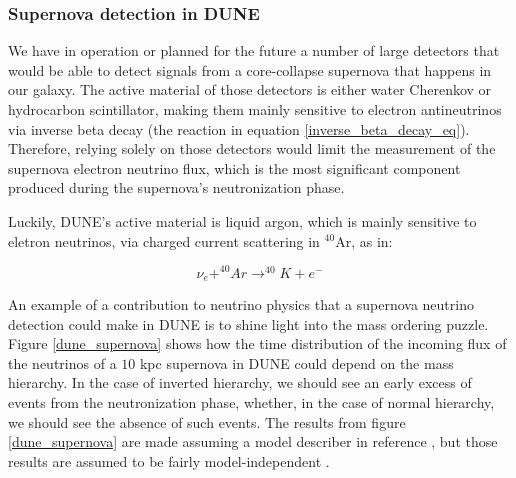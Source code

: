 \subsubsection{Supernova detection in DUNE}

We have in operation or planned for the future a number of large detectors that would be able to detect signals from a core-collapse supernova that happens in our galaxy. The active material of those detectors is either water Cherenkov or hydrocarbon scintillator, making them mainly sensitive to electron antineutrinos via inverse beta decay (the reaction in equation \ref{inverse_beta_decay_eq}). 
Therefore, relying solely on those detectors would limit the measurement of the supernova electron neutrino flux, which is the most significant component produced during the supernova's neutronization phase. 

Luckily, DUNE's active material is liquid argon, which is mainly sensitive to eletron neutrinos, via charged current scattering in $^{40}$Ar, as in:

\begin{equation}
    \nu_e + ^{40}Ar \longrightarrow ^{40}K + e^{-}
    \label{nu_scatter_eq}
\end{equation}
 
An example of a contribution to neutrino physics that a supernova neutrino detection could make in DUNE is to shine light into the mass ordering puzzle. Figure \ref{dune_supernova} shows how the time distribution of the incoming flux of the neutrinos of a $10$ kpc supernova in DUNE could depend on the mass hierarchy. In the case of inverted hierarchy, we should see an early excess of events from the neutronization phase, whether, in the case of normal hierarchy, we should see the absence of such events. The results from figure \ref{dune_supernova} are made assuming a model describer in reference \cite{dune_supernova_model}, but those results are assumed to be fairly model-independent \cite{kate_scholberg}. 

